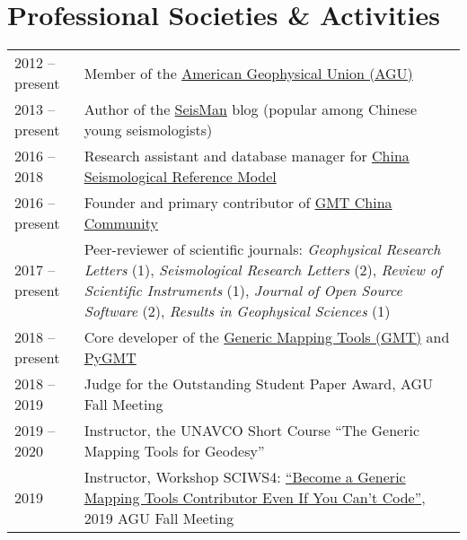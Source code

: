 \section*{Professional Societies \& Activities}

\newcommand{\tabitem}{~~\llap{\textbullet}~~}

\begin{tabular}{p{} p{}}
2012 -- present & Member of the \href{https://sites.agu.org/}{American Geophysical Union (AGU)} \\
2013 -- present & Author of the \href{https://blog.seisman.info}{SeisMan} blog (popular among Chinese young seismologists) \\
2016 -- 2018    & Research assistant and database manager for \href{http://chinageorefmodel.org/}{China Seismological Reference Model} \\
2016 -- present & Founder and primary contributor of \href{http://gmt-china.org/}{GMT China Community} \\
2017 -- present & Peer-reviewer of scientific journals:
                  \textit{Geophysical Research Letters} (1),
                  \textit{Seismological Research Letters} (2),
                  \textit{Review of Scientific Instruments} (1),
                  \textit{Journal of Open Source Software} (2),
                  \textit{Results in Geophysical Sciences} (1) \\
2018 -- present & Core developer of the \href{https://github.com/GenericMappingTools/gmt}{Generic Mapping Tools (GMT)} and \href{https://github.com/GenericMappingTools/pygmt}{PyGMT} \\
2018 -- 2019 & Judge for the Outstanding Student Paper Award, AGU Fall Meeting \\
2019 -- 2020 & Instructor, the UNAVCO Short Course ``The Generic Mapping Tools for Geodesy'' \\
2019 & Instructor, Workshop SCIWS4: \href{https://www.agu.org/Events/SCIWS4-Generic-Mapping-Tools}{``Become a Generic Mapping Tools Contributor Even If You Can't Code''}, 2019 AGU Fall Meeting \\
\end{tabular}
